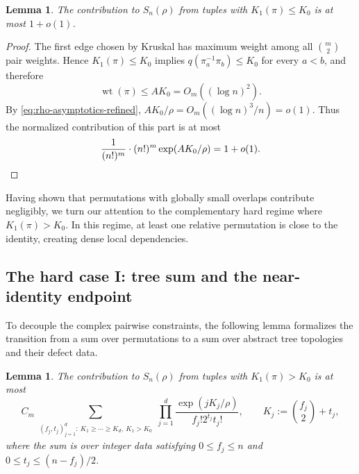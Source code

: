 \documentclass[11pt,reqno]{amsart}
\newtheorem{lemma}[theorem]{Lemma}
\theoremstyle{definition}
\theoremstyle{remark}
\renewcommand\le{\leqslant}
\renewcommand\ge{\geqslant}
\newcommand{\wt}{\operatorname{wt}}
\begin{document}
\begin{lemma}\label{lem:low-weight-part-detailed}
The contribution to $S_n(\rho)$ from tuples with $K_1(\pi)\le K_0$ is at most $1+o(1)$.
\end{lemma}

\begin{proof}
The first edge chosen by Kruskal has maximum weight among all $\binom m2$ pair weights. Hence $K_1(\pi)\le K_0$ implies $q(\pi_a^{-1}\pi_b)\le K_0$ for every $a<b$, and therefore
\[
        \wt(\pi)\le AK_0=O_m((\log n)^2).
\]
By \eqref{eq:rho-asymptotics-refined}, $AK_0/\rho=O_m((\log n)^3/n)=o(1)$. Thus the normalized contribution of this part is at most
\[
\frac1{(n!)^m}\cdot (n!)^m\exp(AK_0/\rho)=1+o(1).
\qedhere\]
\end{proof}

Having shown that permutations with globally small overlaps contribute negligibly, we turn our attention to the complementary hard regime where \(K_1(\pi)>K_0\). In this regime, at least one relative permutation is close to the identity, creating dense local dependencies.

\medskip

\subsection{The hard case I: tree sum and the near-identity endpoint}\label{subsec:hard_regime_near}

To decouple the complex pairwise constraints, the following lemma formalizes the transition from a sum over permutations to a sum over abstract tree topologies and their defect data.

\begin{lemma}\label{lem:tree-data-overcount-detailed}
The contribution to $S_n(\rho)$ from tuples with $K_1(\pi)>K_0$ is at most
\begin{equation}\label{eq:exact-ft-tree-sum}
 C_m
 \sum_{\substack{(f_j,t_j)_{j=1}^d:\ K_1\ge\cdots\ge K_d,
 \ K_1>K_0}}\prod_{j=1}^d
\frac{\exp(jK_j/\rho)}{f_j!2^{t_j}t_j!},
\qquad K_j:=\binom{f_j}2+t_j,
\end{equation}
where the sum is over integer data satisfying $0\le f_j\le n$ and $0\le t_j\le (n-f_j)/2$.
\end{lemma}
\end{document}
